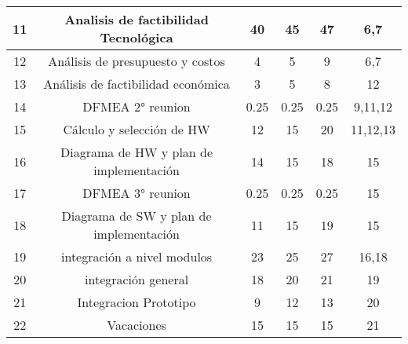 \begin{table}[H]
\begin{tabular}{|c|c|c|c|c|c|}
11          & Analisis de factibilidad Tecnológica    & 40                          & 45                & 47                          & 6,7                                       \\ \hline
12          & Análisis de presupuesto y costos        & 4                           & 5                 & 9                           & 6,7                                       \\ \hline
13          & Análisis de factibilidad económica      & 3                           & 5                 & 8                           & 12                                        \\ \hline
14          & DFMEA 2° reunion                        & 0.25                        & 0.25              & 0.25                        & 9,11,12                                   \\ \hline
15          & Cálculo y selección de HW               & 12                          & 15                & 20                          & 11,12,13                                  \\ \hline
16          & Diagrama de HW y plan de implementación & 14                          & 15                & 18                          & 15                                        \\ \hline
17          & DFMEA 3° reunion                        & 0.25                        & 0.25              & 0.25                        & 15                                        \\ \hline
18          & Diagrama de SW y plan de implementación & 11                          & 15                & 19                          & 15                                        \\ \hline
19          & integración a nivel modulos             & 23                          & 25                & 27                          & 16,18                                     \\ \hline
20          & integración general                     & 18                          & 20                & 21                          & 19                                        \\ \hline
21          & Integracion Prototipo                   & 9                           & 12                & 13                          & 20                                        \\ \hline
22          & Vacaciones                              & 15                          & 15                & 15                          & 21                                        \\ \hline

\end{tabular}
\end{table}
